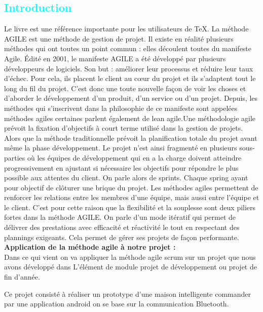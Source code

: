 
\begin{flushleft}
\section*{\textcolor{cyan}{Introduction}}
 Le livre \cite{texbook} est une référence importante pour les utilisateurs de TeX.
 La méthode AGILE est une méthode de gestion de projet. Il existe en réalité plusieurs méthodes qui ont toutes un point commun : elles découlent toutes du manifeste Agile. Édité en 2001, le manifeste AGILE a été développé par plusieurs développeurs de logiciels. Son but : améliorer leur processus et réduire leur taux d'échec. Pour cela, ils placent le client au cœur du projet et ils s'adaptent tout le long du fil du projet. C'est donc une toute nouvelle façon de voir les choses et d'aborder le développement d'un produit, d'un service ou d'un projet. Depuis, les méthodes qui s'inscrivent dans la philosophie de ce manifeste sont appelées méthodes agiles certaines parlent également de lean agile.\newline	Une méthodologie agile prévoit la fixation d’objectifs à court terme utilisé dans la gestion de projets. Alors que la méthode traditionnelle prévoit la planification totale du projet avant même la phase développement. Le projet n'est ainsi fragmenté en plusieurs sous-parties où les équipes de développement qui en a la charge doivent atteindre progressivement en ajustant si nécessaire les objectifs pour répondre le plus possible aux attentes du client. On parle alors de sprints. Chaque spring ayant pour objectif de clôturer une brique du projet. Les méthodes agiles permettent de renforcer les relations entre les membres d’une équipe, mais aussi entre l’équipe et le client. C’est pour cette raison que la flexibilité et la souplesse sont deux piliers fortes dans la méthode AGILE. On parle d’un mode itératif qui permet de délivrer des prestations avec efficacité et réactivité le tout en respectant des plannings exigeants. Cela permet de gérer ses projets de façon performante.\\	\textbf{Application de la méthode agile à notre projet :}\\	Dans ce qui vient on va appliquer la méthode agile scrum sur un projet que nous avons développé dans L'élément de module projet de développement ou projet de fin d'année.
	
Ce projet consisté à réaliser un prototype d'une maison intelligente commander par une application android on se base sur la communication Bluetooth.
\end{flushleft}

\newpage
	